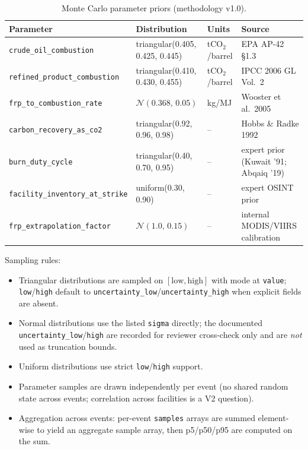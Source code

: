\documentclass[11pt]{article}
\begin{document}
\begin{table}[h]
\centering
\caption{Monte Carlo parameter priors (methodology v1.0).}
\label{tab:priors}
\begin{tabular}{llll}
\toprule
\textbf{Parameter} & \textbf{Distribution} & \textbf{Units} &
\textbf{Source} \\
\midrule
\texttt{crude\_oil\_combustion}      & triangular(0.405, 0.425, 0.445) &
  tCO$_2$/barrel & EPA AP-42 \S1.3 \\
\texttt{refined\_product\_combustion} & triangular(0.410, 0.430, 0.455) &
  tCO$_2$/barrel & IPCC 2006 GL Vol.\ 2 \\
\texttt{frp\_to\_combustion\_rate}   & $\mathcal{N}(0.368,\,0.05)$ &
  kg/MJ          & Wooster et al.\ 2005 \\
\texttt{carbon\_recovery\_as\_co2}   & triangular(0.92, 0.96, 0.98) &
  --             & Hobbs \& Radke 1992 \\
\texttt{burn\_duty\_cycle}           & triangular(0.40, 0.70, 0.95) &
  --             & expert prior (Kuwait '91; Abqaiq '19) \\
\texttt{facility\_inventory\_at\_strike} & uniform(0.30, 0.90) &
  --             & expert OSINT prior \\
\texttt{frp\_extrapolation\_factor}  & $\mathcal{N}(1.0,\,0.15)$ &
  --             & internal MODIS/VIIRS calibration \\
\bottomrule
\end{tabular}
\end{table}

Sampling rules:
\begin{itemize}
\item Triangular distributions are sampled on $[\text{low}, \text{high}]$
  with mode at \texttt{value}; \texttt{low}/\texttt{high} default to
  \texttt{uncertainty\_low}/\texttt{uncertainty\_high} when explicit fields
  are absent.
\item Normal distributions use the listed \texttt{sigma} directly; the
  documented \texttt{uncertainty\_low}/\texttt{high} are recorded for
  reviewer cross-check only and are \emph{not} used as truncation bounds.
\item Uniform distributions use strict \texttt{low}/\texttt{high} support.
\item Parameter samples are drawn independently per event (no shared
  random state across events; correlation across facilities is a V2
  question).
\item Aggregation across events: per-event \texttt{samples} arrays are
  summed element-wise to yield an aggregate sample array, then
  p5/p50/p95 are computed on the sum.
\end{itemize}
\end{document}
